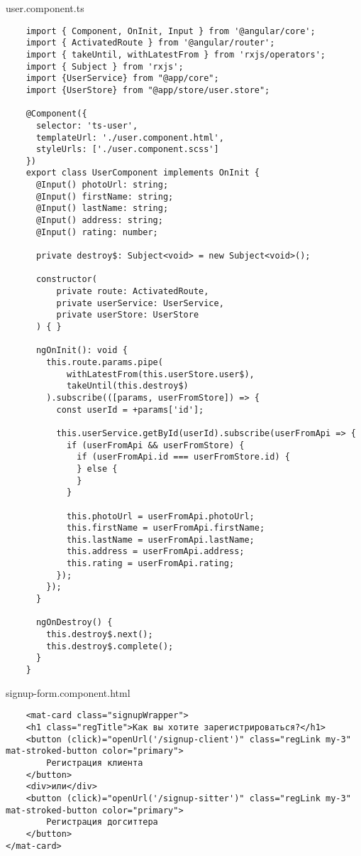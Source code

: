 user.component.ts
\begin{lstlisting}
    import { Component, OnInit, Input } from '@angular/core';
    import { ActivatedRoute } from '@angular/router';
    import { takeUntil, withLatestFrom } from 'rxjs/operators';
    import { Subject } from 'rxjs';
    import {UserService} from "@app/core";
    import {UserStore} from "@app/store/user.store";
    
    @Component({
      selector: 'ts-user',
      templateUrl: './user.component.html',
      styleUrls: ['./user.component.scss']
    })
    export class UserComponent implements OnInit {
      @Input() photoUrl: string;
      @Input() firstName: string;
      @Input() lastName: string;
      @Input() address: string;
      @Input() rating: number;
    
      private destroy$: Subject<void> = new Subject<void>();
    
      constructor(
          private route: ActivatedRoute,
          private userService: UserService,
          private userStore: UserStore
      ) { }
    
      ngOnInit(): void {
        this.route.params.pipe(
            withLatestFrom(this.userStore.user$),
            takeUntil(this.destroy$)
        ).subscribe(([params, userFromStore]) => {
          const userId = +params['id'];
    
          this.userService.getById(userId).subscribe(userFromApi => {
            if (userFromApi && userFromStore) {
              if (userFromApi.id === userFromStore.id) {
              } else {
              }
            }
    
            this.photoUrl = userFromApi.photoUrl;
            this.firstName = userFromApi.firstName;
            this.lastName = userFromApi.lastName;
            this.address = userFromApi.address;
            this.rating = userFromApi.rating;
          });
        });
      }
    
      ngOnDestroy() {
        this.destroy$.next();
        this.destroy$.complete();
      }
    }    
\end{lstlisting}

signup-form.component.html
\begin{lstlisting}
    <mat-card class="signupWrapper">
    <h1 class="regTitle">Как вы хотите зарегистрироваться?</h1>
    <button (click)="openUrl('/signup-client')" class="regLink my-3" mat-stroked-button color="primary">
        Регистрация клиента
    </button>
    <div>или</div>
    <button (click)="openUrl('/signup-sitter')" class="regLink my-3" mat-stroked-button color="primary">
        Регистрация догситтера
    </button>
</mat-card>
\end{lstlisting}

